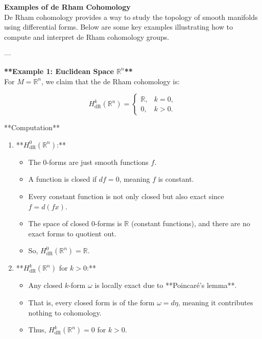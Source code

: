 \documentclass[10pt,a4paper]{report}
\begin{document}
\textbf{Examples of de Rham Cohomology}\\

De Rham cohomology provides a way to study the topology of smooth manifolds using differential forms. Below are some key examples illustrating how to compute and interpret de Rham cohomology groups.

---
\begin{description}

\item \textbf{**Example 1: Euclidean Space \( \mathbb{R}^n \)** } \\
For \( M = \mathbb{R}^n \), we claim that the de Rham cohomology is:

\[
H^k_{\text{dR}}(\mathbb{R}^n) =
\begin{cases}
\mathbb{R}, & k = 0, \\
0, & k > 0.
\end{cases}
\]

**Computation**\\
\begin{enumerate}

\item **\( H^0_{\text{dR}}(\mathbb{R}^n) \):** 
\begin{itemize}
 
   \item  The 0-forms are just smooth functions \( f \).  \\
   \item A function is closed if \( df = 0 \), meaning \( f \) is constant.  \\
   \item Every constant function is not only closed but also exact since \( f = d(fx) \).  \\
   \item The space of closed 0-forms is \( \mathbb{R} \) (constant functions), and there are no exact forms to quotient out.  \\
   \item So, \( H^0_{\text{dR}}(\mathbb{R}^n) = \mathbb{R} \).\\

\end{itemize}
\item **\( H^k_{\text{dR}}(\mathbb{R}^n) \) for \( k > 0 \):**  \\
\begin{itemize}

   \item  Any closed \( k \)-form \( \omega \) is locally exact due to **Poincaré’s lemma**.  \\
   \item  That is, every closed form is of the form \( \omega = d\eta \), meaning it contributes nothing to cohomology.\\
   \item Thus, \( H^k_{\text{dR}}(\mathbb{R}^n) = 0 \) for \( k > 0 \).


\end{itemize}
\end{enumerate}
\end{description}
\end{document}
